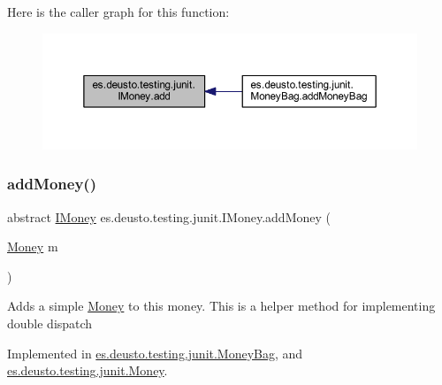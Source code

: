 Here is the caller graph for this function\+:
\nopagebreak
\begin{figure}[H]
\begin{center}
\leavevmode
\includegraphics[width=350pt]{interfacees_1_1deusto_1_1testing_1_1junit_1_1_i_money_a7f3ac1ced239e64294706155c569b8de_icgraph}
\end{center}
\end{figure}
\mbox{\label{interfacees_1_1deusto_1_1testing_1_1junit_1_1_i_money_aab8d4be667a542a8aa1380eb2b6e4257}} 
\subsubsection{\texorpdfstring{add\+Money()}{addMoney()}}
{\footnotesize\ttfamily abstract \hyperlink{interfacees_1_1deusto_1_1testing_1_1junit_1_1_i_money}{I\+Money} es.\+deusto.\+testing.\+junit.\+I\+Money.\+add\+Money (\begin{DoxyParamCaption}\item[{\hyperlink{classes_1_1deusto_1_1testing_1_1junit_1_1_money}{Money}}]{m }\end{DoxyParamCaption})\hspace{0.3cm}{\ttfamily [abstract]}}

Adds a simple \hyperlink{classes_1_1deusto_1_1testing_1_1junit_1_1_money}{Money} to this money. This is a helper method for implementing double dispatch 

Implemented in \hyperlink{classes_1_1deusto_1_1testing_1_1junit_1_1_money_bag_a06ecedbf53ba09d34276fe177e3169bc}{es.\+deusto.\+testing.\+junit.\+Money\+Bag}, and \hyperlink{classes_1_1deusto_1_1testing_1_1junit_1_1_money_a223a447d5daf23b5e9cc0f551b72e328}{es.\+deusto.\+testing.\+junit.\+Money}.

